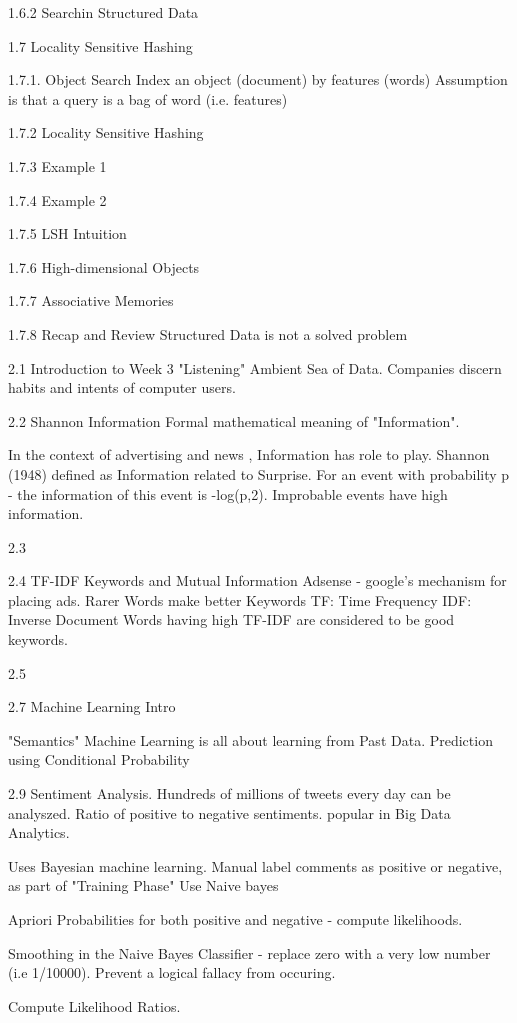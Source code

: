 1.6.2 Searchin Structured Data

1.7 Locality Sensitive Hashing

1.7.1. Object Search
Index an object (document) by features (words)
Assumption is that a query is a bag of word (i.e. features)

1.7.2 Locality Sensitive Hashing

1.7.3 Example 1

1.7.4 Example 2

1.7.5 LSH Intuition

1.7.6 High-dimensional Objects

1.7.7 Associative Memories

1.7.8 Recap and Review
Structured Data is not a solved problem


2.1 Introduction to Week 3 "Listening"
Ambient Sea of Data.
Companies discern habits and intents of computer users.

2.2 Shannon Information
Formal mathematical meaning of "Information".

In the context of advertising and news , Information has role to play.
Shannon (1948) defined as Information related to Surprise.
For an event with probability p - the information of this event is -log(p,2).
Improbable events have high information.

2.3

2.4 TF-IDF
Keywords and Mutual Information
Adsense - google's mechanism for placing ads.
Rarer Words make better Keywords
TF: Time Frequency
IDF: Inverse Document
Words having high TF-IDF are considered to be good keywords.

2.5 

2.7 Machine Learning Intro

"Semantics"
Machine Learning is all about learning from Past Data.
Prediction using Conditional Probability

2.9 Sentiment Analysis.
Hundreds of millions of tweets every day can be analyszed.
Ratio of positive to negative sentiments.
popular in Big Data Analytics.

Uses Bayesian machine learning.
Manual label comments as positive or negative, as part of "Training Phase"
Use Naive bayes

Apriori Probabilities for both positive and negative - compute likelihoods.

Smoothing in the Naive Bayes Classifier - replace zero with a very low number (i.e 1/10000).
Prevent a logical fallacy from occuring.

Compute Likelihood Ratios.
